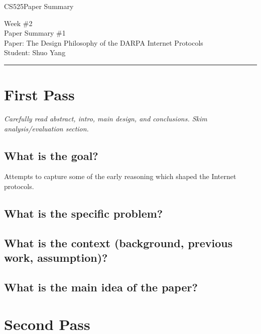 \documentclass[11pt]{article}
\def\CourseCode{CS525}
\def\WeekNo{2}
\def\PaperNo{1}
\def\Category{Paper Summary}
\def\PaperTitle{The Design Philosophy of the DARPA Internet Protocols}
\def\Author{Shuo Yang}
\begin{document}
\noindent

\CourseCode \hfill \Category

\begin{center}
Week \#\WeekNo\\
Paper Summary \#\PaperNo\\
Paper: \PaperTitle\\
Student: \Author\\
\end{center}

\hrule\smallskip

\section{First Pass}

\emph{Carefully read abstract, intro, main design, and
  conclusions. Skim analysis/evaluation section.}

\subsection{What is the goal?}
Attempts to capture some of the early reasoning which shaped the
Internet protocols.

\subsection{What is the specific problem?}

\subsection{What is the context (background, previous work,
  assumption)?} 

\subsection{What is the main idea of the paper?}

\section{Second Pass}
\end{document}
